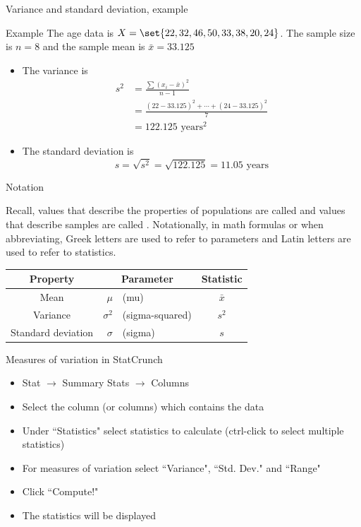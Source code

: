 \documentclass[xcolor=table, handout]{beamer}
\begin{document}
\begin{frame}{Variance and standard deviation, example}
\begin{exampleblock}{Example}
The age data is $X = \set{22, 32, 46, 50, 33, 38, 20, 24}$. The sample size is $n=8$ and the sample mean is $\bar x = 33.125$
\begin{itemize}
\pause
\item The variance is 
\begin{align*}
s^2 &= \frac{\sum (x_i - \bar x)^2}{n-1}\\
&= \frac{(22-33.125)^2 + \cdots + (24-33.125)^2}{7}\\
&= 122.125 \text{ years}^\text{2}
\end{align*}
\pause
\item The standard deviation is
\[s = \sqrt{s^2} = \sqrt{122.125} = 11.05 \text{ years}\]
\end{itemize}
\smallskip
\end{exampleblock}
\end{frame}



\begin{frame}{Notation}
\begin{block}{}
\large
Recall, values that describe the properties of populations are called  and values that describe samples are called . Notationally, in math formulas or when abbreviating, Greek letters are used to refer to parameters and Latin letters are used to refer to statistics.
\pause
\begin{center}
\begin{tabular}{c |r l | c}
Property & \multicolumn{2}{c|}{Parameter} & Statistic\\
\hline
Mean & $\mu$ & (mu) & $\bar x$\\
Variance & $\sigma^2$ &(sigma-squared) & $s^2$\\
Standard deviation & $\sigma$ &(sigma) & $s$
\end{tabular}
\end{center} 
\end{block}
\end{frame}

\begin{frame}{Measures of variation in StatCrunch}
\begin{block}{}
\begin{itemize}
\item Stat $\to$ Summary Stats $\to$ Columns
\item Select the column (or columns) which contains the data
\item Under ``Statistics" select statistics to calculate (ctrl-click to select multiple statistics)
\item For measures of variation select ``Variance", ``Std. Dev." and ``Range"
\item Click ``Compute!"
\item The statistics will be displayed
\end{itemize}
\end{block}

\end{frame}
\end{document}
